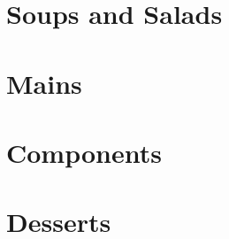 \documentclass[twoside,letterpaper,11pt]{article}
\begin{document}
\vspace{150pt}
\phantom{text}
\section{Soups and Salads}

\newpage

\vspace{150pt}
\phantom{text}
\section{Mains}

\newpage
\newpage
\newpage
\newpage

\vspace{150pt}
\phantom{text}
\section{Components}

\newpage
\newpage
\newpage
\newpage

\vspace{150pt}
\phantom{text}
\section{Desserts}

\newpage
\newpage
\end{document}
